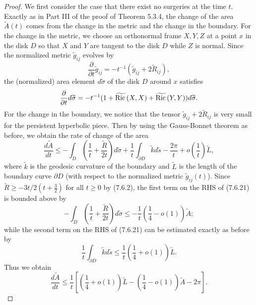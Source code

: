 \begin{proof}
We first consider the case that there exist no surgeries at the
time $t$. Exactly as in Part III of the proof of Theorem 5.3.4,
the change of the area $\widetilde{A}(t)$ comes from the change in
the metric and the change in the boundary. For the change in the
metric, we choose an orthonormal frame $X,Y,Z$ at a point $x$ in
the disk $D$ so that $X$ and $Y$ are tangent to the disk $D$ while
$Z$ is normal. Since the normalized metric $\widetilde{g}_{ij}$
evolves by
$$
\frac{\partial}{\partial t}\widetilde{g}_{ij}
=-t^{-1}(\widetilde{g}_{ij}+2\widetilde{R}_{ij}),
$$
the (normalized) area element $d\widetilde{\sigma}$ of the disk
$D$ around $x$ satisfies
$$\frac{\partial}{\partial t}d\widetilde{\sigma}
=-t^{-1}(1+\widetilde{{\rm Ric}\,}(X,X)+\widetilde{{\rm Ric}\,}(Y,Y))
d\widetilde{\sigma}.
$$
For the change in the boundary, we notice that the tensor
$\widetilde{g}_{ij}+2\widetilde{R}_{ij}$ is very small for the
persistent hyperbolic piece. Then by using the Gauss-Bonnet
theorem as before, we obtain the rate of change of the area \begin{equation}
\frac{d\widetilde{A}}{dt}\leq
-\int_D\left(\frac{1}{t}+\frac{\widetilde{R}}{2t}\right)
d\widetilde{\sigma}+\frac{1}{t}\int_{\partial
D}\widetilde{k}d\widetilde{s}-\frac{2\pi}{t}+
o\left(\frac{1}{t}\right)\widetilde{L}, %
\end{equation} where $\widetilde{k}$ is the geodesic curvature of the
boundary and $\widetilde{L}$ is the length of the boundary curve
$\partial D$ (with respect to the normalized metric
$\widetilde{g}_{ij}(t)$).  Since $\widetilde{R}\geq
-{3t}/{2(t+\frac{3}{2})}$ for all $t\geq 0$ by (7.6.2), the first
term on the RHS of (7.6.21) is bounded above by
$$
-\int_D\left(\frac{1}{t}+\frac{\widetilde{R}}{2t}\right)d\widetilde{\sigma}\leq
-\frac{1}{t}\left(\frac{1}{4}- o(1)\right)\widetilde{A};
$$
while the second term on the RHS of (7.6.21) can be estimated
exactly as before by
$$
\frac{1}{t}\int_{\partial D}\widetilde{k}d\widetilde{s}\leq
\frac{1}{t}\left(\frac{1}{4}+o(1)\right)\widetilde{L}.
$$
Thus we obtain \begin{equation} \frac{d\widetilde{A}}{dt}\leq
\frac{1}{t}\left[\left(\frac{1}{4}+o(1)\right)
\widetilde{L}-\left(\frac{1}{4}-o(1)\right)\widetilde{A}-2\pi\right].
\end{equation}


\end{proof}
